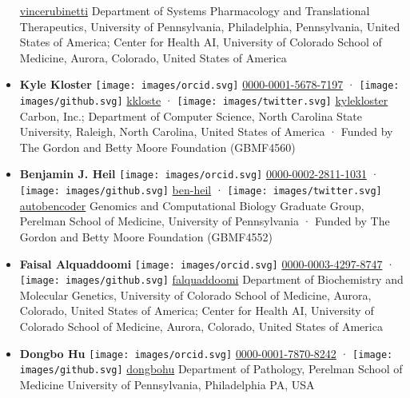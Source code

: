 \begin{itemize}
  \href{https://github.com/vincerubinetti}{vincerubinetti}
  Department of Systems Pharmacology and Translational Therapeutics, University of Pennsylvania, Philadelphia, Pennsylvania, United States of America; Center for Health AI, University of Colorado School of Medicine, Aurora, Colorado, United States of America
\item
  \textbf{Kyle Kloster}
  \texttt{[image: images/orcid.svg]}
  \href{https://orcid.org/0000-0001-5678-7197}{0000-0001-5678-7197}
  · \texttt{[image: images/github.svg]}
  \href{https://github.com/kkloste}{kkloste}
  · \texttt{[image: images/twitter.svg]}
  \href{https://twitter.com/kylekloster}{kylekloster}
  Carbon, Inc.; Department of Computer Science, North Carolina State University, Raleigh, North Carolina, United States of America
  · Funded by The Gordon and Betty Moore Foundation (GBMF4560)
\item
  \textbf{Benjamin J. Heil}
  \texttt{[image: images/orcid.svg]}
  \href{https://orcid.org/0000-0002-2811-1031}{0000-0002-2811-1031}
  · \texttt{[image: images/github.svg]}
  \href{https://github.com/ben-heil}{ben-heil}
  · \texttt{[image: images/twitter.svg]}
  \href{https://twitter.com/autobencoder}{autobencoder}
  Genomics and Computational Biology Graduate Group, Perelman School of Medicine, University of Pennsylvania
  · Funded by The Gordon and Betty Moore Foundation (GBMF4552)
\item
  \textbf{Faisal Alquaddoomi}
  \texttt{[image: images/orcid.svg]}
  \href{https://orcid.org/0000-0003-4297-8747}{0000-0003-4297-8747}
  · \texttt{[image: images/github.svg]}
  \href{https://github.com/falquaddoomi}{falquaddoomi}
  Department of Biochemistry and Molecular Genetics, University of Colorado School of Medicine, Aurora, Colorado, United States of America; Center for Health AI, University of Colorado School of Medicine, Aurora, Colorado, United States of America
\item
  \textbf{Dongbo Hu}
  \texttt{[image: images/orcid.svg]}
  \href{https://orcid.org/0000-0001-7870-8242}{0000-0001-7870-8242}
  · \texttt{[image: images/github.svg]}
  \href{https://github.com/dongbohu}{dongbohu}
  Department of Pathology, Perelman School of Medicine University of Pennsylvania, Philadelphia PA, USA

\end{itemize}
